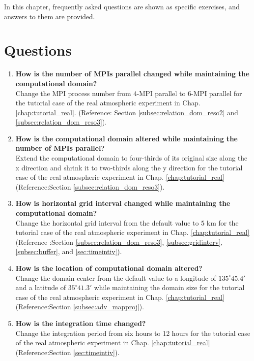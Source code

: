 
In this chapter, frequently asked questions are shown as specific exercises, and answers to them are provided. %

\section*{Questions}

\begin{enumerate}
\item {\bf How is the number of MPIs parallel changed while maintaining the computational domain?}\\
Change the MPI process number from 4-MPI parallel to 6-MPI parallel for the tutorial case of the real atmospheric experiment in Chap. \ref{chap:tutorial_real}.
(Reference: Section \ref{subsec:relation_dom_reso2} and \ref{subsec:relation_dom_reso3}).

\item {\bf How is the computational domain altered while maintaining the number of MPIs parallel?}\\
Extend the computational domain to four-thirds of its original size along the x direction and shrink it to two-thirds along the y direction for the tutorial case of the real atmospheric experiment in Chap. \ref{chap:tutorial_real} (Reference:Section \ref{subsec:relation_dom_reso3}).

\item {\bf How is horizontal grid interval changed while maintaining the computational domain?}\\ 
Change the horizontal grid interval from the default value to 5 km for the tutorial case of the real atmospheric experiment in Chap. \ref{chap:tutorial_real} (Reference :Section \ref{subsec:relation_dom_reso3}, \ref{subsec:gridinterv}, \ref{subsec:buffer}, and \ref{sec:timeintiv}).

\item {\bf How is the location of computational domain altered?}\\
Change the domain center from the default value to a longitude of $135^\circ 45.4'$ and a latitude of $35^\circ 41.3'$ while maintaining the domain size for the tutorial case of the real atmospheric experiment in Chap. \ref{chap:tutorial_real} (Reference:Section \ref{subsec:adv_mapproj}).

\item {\bf How is the integration time changed?}\\
Change the integration period from six hours to 12 hours for the tutorial case of the real atmospheric experiment in Chap. \ref{chap:tutorial_real}
(Reference:Section \ref{sec:timeintiv}).


\end{enumerate}
